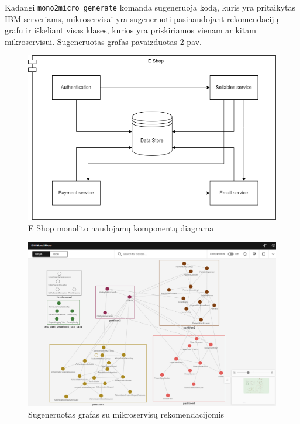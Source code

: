 \documentclass{VUMIFPSbakalaurinis}
\begin{document}
Kadangi \verb|mono2micro generate| komanda sugeneruoja kodą, kuris yra pritaikytas IBM serveriams, mikroservisai yra sugeneruoti pasinaudojant rekomendacijų grafu ir iškeliant visas klases, kurios yra priskiriamos vienam ar kitam mikroservisui. Sugeneruotas grafas pavaizduotas \ref{img:grafas} pav. 

\begin{figure}[H]
    \centering
    \includegraphics[scale=0.6]{img/komponentu diagrama.drawio.png}
    \caption{E Shop monolito naudojamų komponentų diagrama}
    \label{img:e-shop-komponentai}
\end{figure}


\begin{figure}[H]
    \centering
    \includegraphics[scale=0.4]{img/grafas.png}
    \caption{Sugeneruotas grafas su mikroservisų rekomendacijomis}
    \label{img:grafas}
\end{figure}
\end{document}
